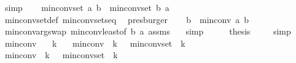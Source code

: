 \begin{isabellebody}
\ simp\isanewline
\ \ \isamarkupfalse%
\ {\isachardoublequoteopen}min{\isacharunderscore}{\kern0pt}conv{\isacharunderscore}{\kern0pt}set\ a\ b\ {\isacharequal}{\kern0pt}\ min{\isacharunderscore}{\kern0pt}conv{\isacharunderscore}{\kern0pt}set\ b\ a{\isachardoublequoteclose}\isanewline
\ \ \ \ \isamarkupfalse%
\ min{\isacharunderscore}{\kern0pt}conv{\isacharunderscore}{\kern0pt}set{\isacharunderscore}{\kern0pt}def\ min{\isacharunderscore}{\kern0pt}conv{\isacharunderscore}{\kern0pt}sets{\isacharunderscore}{\kern0pt}eq\ \isamarkupfalse%
\ presburger\isanewline
\ \ \isamarkupfalse%
\ {\isachardoublequoteopen}b\ {\isasymle}\ min{\isacharunderscore}{\kern0pt}conv\ a\ b{\isachardoublequoteclose}\ \isanewline
\ \ \ \ \isamarkupfalse%
\ min{\isacharunderscore}{\kern0pt}conv{\isacharunderscore}{\kern0pt}arg{\isacharunderscore}{\kern0pt}swap\ min{\isacharunderscore}{\kern0pt}conv{\isacharunderscore}{\kern0pt}least{\isacharbrackleft}{\kern0pt}of\ {\isachardoublequoteopen}b{\isachardoublequoteclose}\ {\isachardoublequoteopen}a{\isachardoublequoteclose}{\isacharbrackright}{\kern0pt}\ assms{\isacharparenleft}{\kern0pt}{}{\isacharcomma}{\kern0pt}{}{\isacharparenright}{\kern0pt}\ {}\ \isamarkupfalse%
\ simp\isanewline
\ \ \isamarkupfalse%
\ \isamarkupfalse%
\ {\isacharquery}{\kern0pt}thesis\ \isamarkupfalse%
\ {}\ \isamarkupfalse%
\ simp\isanewline
{}\isamarkupfalse%
%
\endisatagproof
{\isafoldproof}%
%
\isadelimproof
\isanewline
%
\endisadelimproof
\isanewline
{}\isamarkupfalse%
\ min{\isacharunderscore}{\kern0pt}conv{\isacharunderscore}{\kern0pt}{}{\isacharcolon}{\kern0pt}\isanewline
\ \ \ {\isachardoublequoteopen}k{\isasymge}{}{\isachardoublequoteclose}\isanewline
\ \ \ {\isachardoublequoteopen}min{\isacharunderscore}{\kern0pt}conv\ {}\ k\ {\isacharequal}{\kern0pt}\ {}{\isachardoublequoteclose}\ {\isachardoublequoteopen}min{\isacharunderscore}{\kern0pt}conv{\isacharunderscore}{\kern0pt}set\ {}\ k\ {\isasymnoteq}\ {\isacharbraceleft}{\kern0pt}{\isacharbraceright}{\kern0pt}{\isachardoublequoteclose}\isanewline
%
\isadelimproof
%
\endisadelimproof
%
\isatagproof
{}\isamarkupfalse%
{\isacharminus}{\kern0pt}\isanewline
\ \ \isamarkupfalse%
\ {\isachardoublequoteopen}min{\isacharunderscore}{\kern0pt}conv\ {}\ k\ {\isasymle}\ {}{\isachardoublequoteclose}\ {\isachardoublequoteopen}min{\isacharunderscore}{\kern0pt}conv{\isacharunderscore}{\kern0pt}set\ {}\ k\ {\isasymnoteq}\ {\isacharbraceleft}{\kern0pt}{\isacharbraceright}{\kern0pt}{\isachardoublequoteclose}\isanewline

\end{isabellebody}

